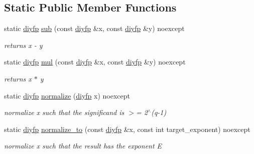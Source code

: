 \subsection*{Static Public Member Functions}
\begin{DoxyCompactItemize}
\item 
static \hyperlink{structnlohmann_1_1detail_1_1dtoa__impl_1_1diyfp}{diyfp} \hyperlink{structnlohmann_1_1detail_1_1dtoa__impl_1_1diyfp_aeb26771af54ad73598c1a0430d65d884}{sub} (const \hyperlink{structnlohmann_1_1detail_1_1dtoa__impl_1_1diyfp}{diyfp} \&x, const \hyperlink{structnlohmann_1_1detail_1_1dtoa__impl_1_1diyfp}{diyfp} \&y) noexcept
\begin{DoxyCompactList}\small\item\em returns x -\/ y \end{DoxyCompactList}\item 
static \hyperlink{structnlohmann_1_1detail_1_1dtoa__impl_1_1diyfp}{diyfp} \hyperlink{structnlohmann_1_1detail_1_1dtoa__impl_1_1diyfp_aa5f250d12ce89c81fdb08900c6a823e8}{mul} (const \hyperlink{structnlohmann_1_1detail_1_1dtoa__impl_1_1diyfp}{diyfp} \&x, const \hyperlink{structnlohmann_1_1detail_1_1dtoa__impl_1_1diyfp}{diyfp} \&y) noexcept
\begin{DoxyCompactList}\small\item\em returns x $\ast$ y \end{DoxyCompactList}\item 
static \hyperlink{structnlohmann_1_1detail_1_1dtoa__impl_1_1diyfp}{diyfp} \hyperlink{structnlohmann_1_1detail_1_1dtoa__impl_1_1diyfp_a2246b5b40c7c6992153ef174063d6aa6}{normalize} (\hyperlink{structnlohmann_1_1detail_1_1dtoa__impl_1_1diyfp}{diyfp} x) noexcept
\begin{DoxyCompactList}\small\item\em normalize x such that the significand is $>$= 2$^\wedge$(q-\/1) \end{DoxyCompactList}\item 
static \hyperlink{structnlohmann_1_1detail_1_1dtoa__impl_1_1diyfp}{diyfp} \hyperlink{structnlohmann_1_1detail_1_1dtoa__impl_1_1diyfp_a6b6665e467ebabe0c0f7418d3fe4b118}{normalize\+\_\+to} (const \hyperlink{structnlohmann_1_1detail_1_1dtoa__impl_1_1diyfp}{diyfp} \&x, const int target\+\_\+exponent) noexcept
\begin{DoxyCompactList}\small\item\em normalize x such that the result has the exponent E \end{DoxyCompactList}\end{DoxyCompactItemize}
